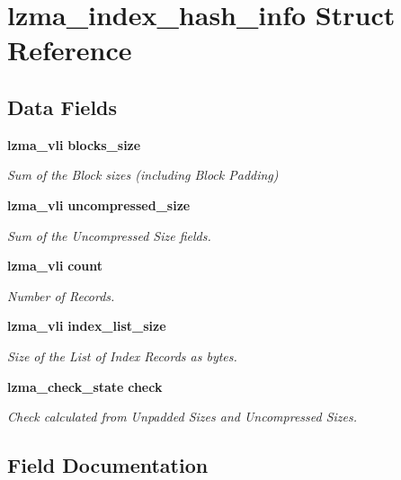 \section{lzma\+\_\+index\+\_\+hash\+\_\+info Struct Reference}
\label{structlzma__index__hash__info}
\subsection*{Data Fields}
\begin{DoxyCompactItemize}
\item 
\textbf{ lzma\+\_\+vli} \textbf{ blocks\+\_\+size}
\begin{DoxyCompactList}\small\item\em Sum of the Block sizes (including Block Padding) \end{DoxyCompactList}\item 
\textbf{ lzma\+\_\+vli} \textbf{ uncompressed\+\_\+size}
\begin{DoxyCompactList}\small\item\em Sum of the Uncompressed Size fields. \end{DoxyCompactList}\item 
\textbf{ lzma\+\_\+vli} \textbf{ count}
\begin{DoxyCompactList}\small\item\em Number of Records. \end{DoxyCompactList}\item 
\textbf{ lzma\+\_\+vli} \textbf{ index\+\_\+list\+\_\+size}
\begin{DoxyCompactList}\small\item\em Size of the List of Index Records as bytes. \end{DoxyCompactList}\item 
\textbf{ lzma\+\_\+check\+\_\+state} \textbf{ check}
\begin{DoxyCompactList}\small\item\em Check calculated from Unpadded Sizes and Uncompressed Sizes. \end{DoxyCompactList}\end{DoxyCompactItemize}


\subsection{Field Documentation}
\mbox{\label{structlzma__index__hash__info_ac60fec3e093c44c620dea2cd3b9a0327}} 

